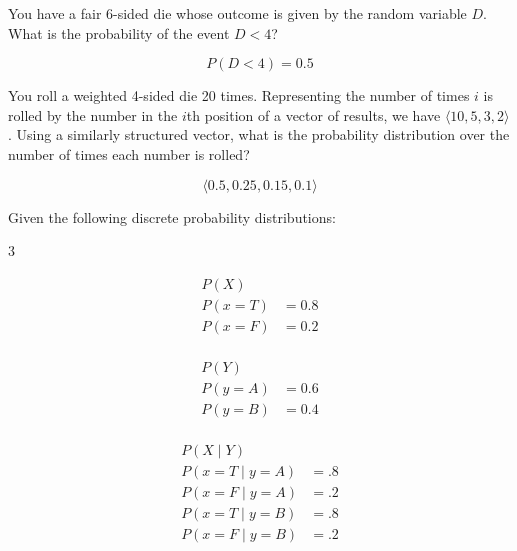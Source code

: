 \begin{questions}


\question You have a fair 6-sided die whose outcome is given by the random variable $D$.  What is the probability of the event $D < 4$?

\begin{solution}[.5in]
\[
P(D < 4) = 0.5
\]
\end{solution}


\question You roll a weighted 4-sided die 20 times.  Representing the number of times $i$ is rolled by the number in the $i$th position of a vector of results, we have $\langle 10, 5, 3, 2 \rangle$.  Using a similarly structured vector, what is the probability distribution over the number of times each number is rolled?

\begin{solution}[.5in]
\[
\langle 0.5, 0.25, 0.15, 0.1 \rangle
\]
\end{solution}

\question Given the following discrete probability distributions:

\vspace{-.25in}

\begin{multicols}{3}

\begin{align*}
P(X)\\
P(x=T) &= 0.8\\
P(x=F) &= 0.2\\
\end{align*}

\columnbreak

\begin{align*}
P(Y)\\
P(y=A) &= 0.6\\
P(y=B) &= 0.4\\
\end{align*}

\columnbreak

\begin{align*}
P(X \mid Y)\\
P(x=T \mid y = A) &= .8\\
P(x=F \mid y = A) &= .2\\
P(x=T \mid y = B) &= .8\\
P(x=F \mid y = B) &= .2\\
\end{align*}

\end{multicols}


\end{questions}
